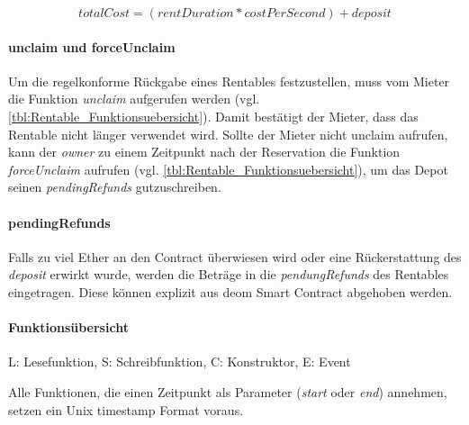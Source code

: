 \begin{equation}
\label{math:Rentable_Cost}
totalCost = (rentDuration * costPerSecond) + deposit
\end{equation}

\paragraph{unclaim und forceUnclaim}
\label{sys_para:claim_unclaim}
Um die regelkonforme Rückgabe eines Rentables festzustellen, muss vom Mieter die Funktion \emph{unclaim} aufgerufen werden (vgl. \ref{tbl:Rentable_Funktionsuebersicht}). Damit bestätigt der Mieter, dass das Rentable nicht länger verwendet wird. Sollte der Mieter nicht unclaim aufrufen, kann der \emph{owner} zu einem Zeitpunkt nach der Reservation die Funktion \emph{forceUnclaim} aufrufen (vgl. \ref{tbl:Rentable_Funktionsuebersicht}), um das Depot seinen \emph{pendingRefunds} gutzuschreiben.

\paragraph{pendingRefunds}
Falls zu viel Ether an den Contract überwiesen wird oder eine Rückerstattung des \emph{deposit} erwirkt wurde, werden die Beträge in die \emph{pendungRefunds} des Rentables eingetragen. Diese können explizit aus deom Smart Contract abgehoben werden.\cite[Miscellaneous/Introduction to Smart Contracts]{solidity.readthedocs.io}

\paragraph{Funktionsübersicht}

L: Lesefunktion, S: Schreibfunktion, C: Konstruktor, E: Event

Alle Funktionen, die einen Zeitpunkt als Parameter (\emph{start} oder \emph{end}) annehmen, setzen ein Unix timestamp Format voraus.

